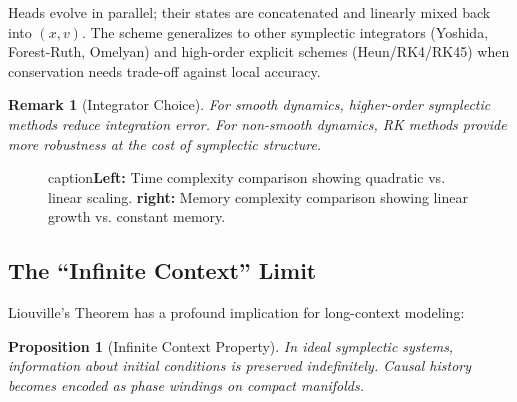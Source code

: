 \documentclass[12pt,letterpaper,twoside]{article}
\newtheorem{remarque}{Remark}[section]
\newtheorem{prop}{Proposition}[section]
\begin{document}
Heads evolve in parallel; their states are concatenated and linearly mixed back into $(x, v)$. The scheme generalizes to other symplectic integrators (Yoshida, Forest-Ruth, Omelyan) and high-order explicit schemes (Heun/RK4/RK45) when conservation needs trade-off against local accuracy.

\begin{remarque}[Integrator Choice]
For smooth dynamics, higher-order symplectic methods reduce integration error. For non-smooth dynamics, RK methods provide more robustness at the cost of symplectic structure.
\end{remarque}

\begin{figure}[htbp]
\centering
{}
\hfill
{}
caption{\textbf{Left:} Time complexity comparison showing quadratic vs. linear scaling. \textbf{right:} Memory complexity comparison showing linear growth vs. constant memory.}
\label{fig:complexity-symplectic}
\end{figure}

\subsection{The ``Infinite Context'' Limit}

Liouville's Theorem has a profound implication for long-context modeling:

\begin{prop}[Infinite Context Property]
In ideal symplectic systems, information about initial conditions is preserved indefinitely. Causal history becomes encoded as phase windings on compact manifolds.
\end{prop}
\end{document}
